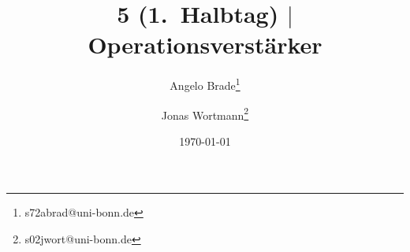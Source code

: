 \documentclass[a4paper,10pt]{article}
\numberwithin{equation}{section}
\begin{document}

\begin{titlepage}
	\title{5 (1.\ Halbtag) $|$ Operationsverstärker}
	\author[1]{Angelo Brade\thanks{s72abrad@uni-bonn.de}}
	\author[1]{Jonas Wortmann\thanks{s02jwort@uni-bonn.de}}
	\date{\today}
\end{titlepage}

\maketitle
{}


\newpage


\fancyhead[R]{\leftmark}
\fancyhead[L]{\thepage}
\fancyfoot[C]{}

\tableofcontents


\clearpage


\end{document}
